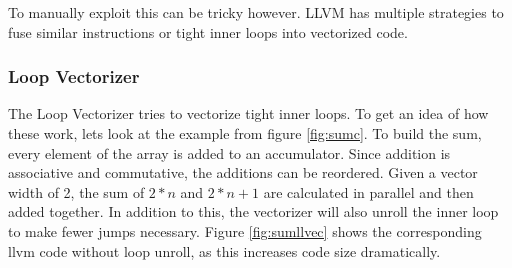 \documentclass[a4paper,bibliography=totocnumbered,parskip,headsepline]{scrbook}
\begin{document}
To manually exploit this can be tricky however.
LLVM has multiple strategies to fuse similar instructions or tight inner loops into vectorized code.\cite{llvmauto}

\subsubsection{Loop Vectorizer}
The Loop Vectorizer tries to vectorize tight inner loops.
To get an idea of how these work, lets look at the example from figure \ref{fig:sumc}.
To build the sum, every element of the array is added to an accumulator.
Since addition is associative and commutative, the additions can be reordered.
Given a vector width of 2, the sum of $2*n$ and $2*n+1$ are calculated in parallel and then added together.
In addition to this, the vectorizer will also unroll the inner loop to make fewer jumps necessary.
Figure \ref{fig:sumllvec} shows the corresponding llvm code without loop unroll, as this increases code size dramatically.
\end{document}
